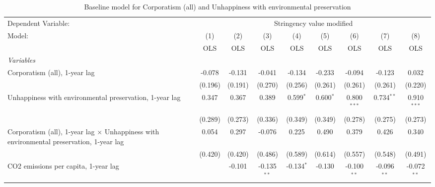 
\begin{table}[htbp]
   \caption{Baseline model for Corporatism (all) and Unhappiness with environmental preservation}
   \centering
   \begin{tabular}{lcccccccc}
      \toprule
      Dependent Variable: & \multicolumn{8}{c}{Stringency value modified}\\
      Model:                                                                                          & (1)     & (2)     & (3)           & (4)           & (5)          & (6)           & (7)           & (8)\\  
                                                                                                      &  OLS    & OLS     & OLS           & OLS           & OLS          & OLS           & OLS           & OLS\\  
      \midrule
      \emph{Variables}\\
      Corporatism (all), 1-year lag                                                                   & -0.078  & -0.131  & -0.041        & -0.134        & -0.233       & -0.094        & -0.123        & 0.032\\   
                                                                                                      & (0.196) & (0.191) & (0.270)       & (0.256)       & (0.261)      & (0.261)       & (0.261)       & (0.220)\\   
      Unhappiness with environmental preservation, 1-year lag                                         & 0.347   & 0.367   & 0.389         & 0.599$^{*}$   & 0.600$^{*}$  & 0.800$^{***}$ & 0.734$^{**}$  & 0.910$^{***}$\\   
                                                                                                      & (0.289) & (0.273) & (0.336)       & (0.349)       & (0.349)      & (0.278)       & (0.275)       & (0.273)\\   
      Corporatism (all), 1-year lag $\times$ Unhappiness with environmental preservation, 1-year lag  & 0.054   & 0.297   & -0.076        & 0.225         & 0.490        & 0.379         & 0.426         & 0.340\\   
                                                                                                      & (0.420) & (0.420) & (0.486)       & (0.589)       & (0.614)      & (0.557)       & (0.548)       & (0.491)\\   
      CO2 emissions per capita, 1-year lag                                                            &         & -0.101  & -0.135$^{**}$ & -0.134$^{*}$  & -0.130       & -0.100$^{**}$ & -0.096$^{**}$ & -0.072$^{**}$\\   

\end{tabular}
\end{table}
